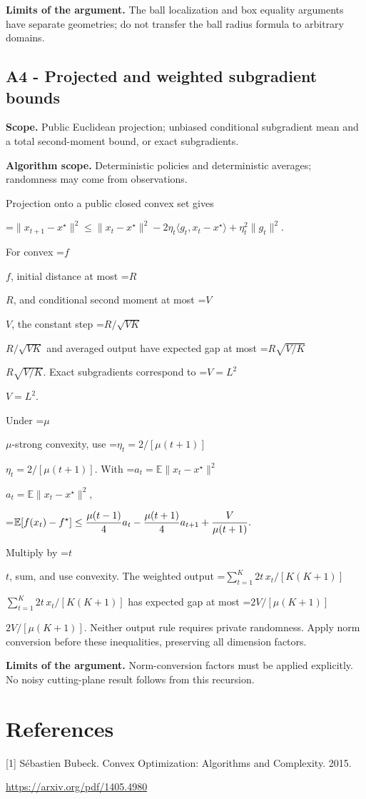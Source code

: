 \documentclass[10pt,a4paper]{article}
\newcommand{\AtlasMath}[1]{\par\begingroup\centering\setbox0=\hbox{$\displaystyle #1$}\ifdim\wd0>1.4\linewidth\typeout{ATLAS WIDE FORMULA: \the\wd0}\fi\ifdim\wd0>\linewidth\resizebox{\linewidth}{!}{\box0}\else\box0\fi\par\endgroup}
\newcommand{\AtlasInlineMath}[1]{\begingroup\setbox0=\hbox{$#1$}\ifdim\wd0>.4\linewidth\endgroup\AtlasMath{#1}\else\endgroup$#1$\fi}
\begin{document}
\textbf{Limits of the argument.} The ball localization and box equality arguments have separate geometries; do not transfer the ball radius formula to arbitrary domains.

\subsection{A4 - Projected and weighted subgradient bounds}
\textbf{Scope.} Public Euclidean projection; unbiased conditional subgradient mean and a total second-moment bound, or exact subgradients.

\textbf{Algorithm scope.} Deterministic policies and deterministic averages; randomness may come from observations.

Projection onto a public closed convex set gives

\AtlasMath{\|x_{t+1}-x^\star\|^2\le\|x_t-x^\star\|^2
-2\eta_t\langle g_t,x_t-x^\star\rangle+\eta_t^2\|g_t\|^2.}

For convex \AtlasInlineMath{f}, initial distance at most \AtlasInlineMath{R}, and conditional second moment at most \AtlasInlineMath{V}, the constant step \AtlasInlineMath{R/\sqrt{VK}} and averaged output have expected gap at most \AtlasInlineMath{R\sqrt{V/K}}. Exact subgradients correspond to \AtlasInlineMath{V=L^2}.

Under \AtlasInlineMath{\mu}-strong convexity, use \AtlasInlineMath{\eta_t=2/[\mu(t+1)]}. With \AtlasInlineMath{a_t=\mathbb E\|x_t-x^\star\|^2},

\AtlasMath{\mathbb E[f(x_t)-f^\star]\le{\mu(t-1)\over4}a_t
-{\mu(t+1)\over4}a_{t+1}+{V\over\mu(t+1)}.}

Multiply by \AtlasInlineMath{t}, sum, and use convexity. The weighted output
\AtlasInlineMath{\sum_{t=1}^K2t\,x_t/[K(K+1)]} has expected gap at most \AtlasInlineMath{2V/[\mu(K+1)]}. Neither output rule requires private randomness. Apply norm conversion before these inequalities, preserving all dimension factors.

\textbf{Limits of the argument.} Norm-conversion factors must be applied explicitly. No noisy cutting-plane result follows from this recursion.

\section{References}
[1] Sébastien Bubeck. Convex Optimization: Algorithms and Complexity. 2015.

\url{https://arxiv.org/pdf/1405.4980}
\end{document}
